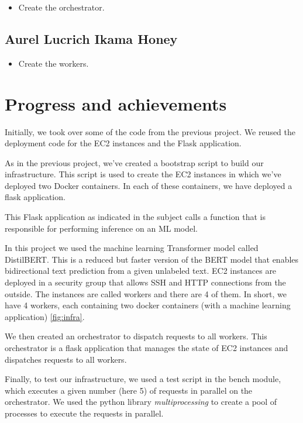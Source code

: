 \documentclass[letterpaper,headings=standardclasses,parskip=half]{scrartcl}
\begin{document}
\begin{itemize}
    \item Create the orchestrator.
\end{itemize}

\subsection*{Aurel Lucrich Ikama Honey}

\begin{itemize}
    \item Create the workers.
\end{itemize}

\section{Progress and achievements}

Initially, we took over some of the code from the previous project. We reused the deployment code for the EC2 instances and the Flask application.

As in the previous project, we've created a bootstrap script to build our infrastructure. This script is used to create the EC2 instances in which we've deployed two Docker containers. In each of these containers, we have deployed a flask application.

This Flask application as indicated in the subject calls a function that is responsible for performing inference on an ML model.

In this project we used the machine learning Transformer model called
DistilBERT. This is a reduced but faster version of the BERT model that enables
bidirectional text prediction from a given unlabeled text. EC2 instances are
deployed in a security group that allows SSH and HTTP connections from the
outside. The instances are called workers and there are 4 of them. In short, we
have 4 workers, each containing two docker containers (with a machine learning application) \ref{fig:infra}.

We then created an orchestrator to dispatch requests to all workers. This orchestrator is a flask application that manages the state of EC2 instances and dispatches requests to all workers.

Finally, to test our infrastructure, we used a test script in the bench module, which executes a given number (here 5) of requests in parallel on the orchestrator. We used the python library \emph{multiprocessing} to create a pool of processes to execute the requests in parallel.
\end{document}
